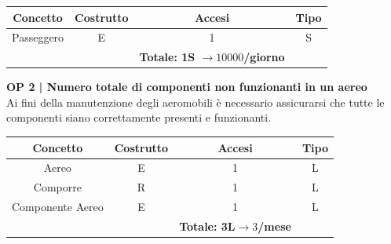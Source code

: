 \begin{tabular}{ c c c c}
	\hline
	\rowcolor{airforceblue}
	\textbf{\color{white}Concetto} & \textbf{\color{white}Costrutto} & \textbf{\color{white}Accesi} & \textbf{\color{white}Tipo}\\
	\hline
	\textsf{\small Passeggero} & \textsf{\small E} & \textsf{\small 1} &  \textsf{\small S}\\
	\hline
	\rowcolor{airforceblue}
	\textsf{\small } & \textsf{\small } & \textbf{\color{white}Totale: 1S $\rightarrow 10000$/giorno} \textsf{\small } & \textsf{\small }\\ %
	\hline
\end{tabular}

\vspace{.6cm}


\textbf{\small OP 2 | Numero totale di componenti non funzionanti in un aereo}\\

\textsf{\small Ai fini della manutenzione degli aeromobili è necessario assicurarsi che tutte le componenti siano correttamente presenti e funzionanti.}\break

\begin{tabular}{ c c c c}
	\hline
	\rowcolor{airforceblue}
	\textbf{\color{white}Concetto} & \textbf{\color{white}Costrutto} & \textbf{\color{white}Accesi} & \textbf{\color{white}Tipo}\\
	\hline
	\textsf{\small Aereo} & \textsf{\small E} & \textsf{\small 1} &  \textsf{\small L}\\
	\hline
	\textsf{\small Comporre} & \textsf{\small R} & \textsf{\small 1} &  \textsf{\small L}\\
	\hline
	\textsf{\small Componente Aereo} & \textsf{\small E} & \textsf{\small 1} &  \textsf{\small L}\\
	\hline
	\rowcolor{airforceblue}
	\textsf{\small } & \textsf{\small } & \textbf{\color{white}Totale: 3L$\rightarrow 3$/mese} \textsf{\small } & \textsf{\small }\\ 
	\hline
\end{tabular}

